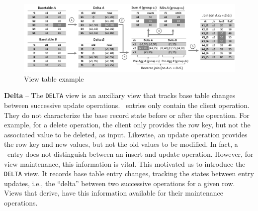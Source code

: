 


\begin{figure}
  \includegraphics[width=\linewidth]{figures/ViewCalculationExample}
  \caption{View table example}\label{fig:view_table_example}
\endminipage\hfill
\vspace{-2mm}  
\end{figure}

\noindent  
\textbf{Delta} -- The \texttt{DELTA} view is an auxiliary view that
tracks base table changes between successive update operations.  
\TL\ entries only contain the client operation.
They do not characterize the base record state before or after the
operation. For example, for a delete operation, the client only provides
the row key, but not the associated value to be deleted, as input.
Likewise, an update operation provides the row key and new values, but
not the old values to be modified. In fact, a \TL\ entry does not
distinguish between an insert and update operation. However, for view 
maintenance, this information is vital. This motivated us to introduce 
the \texttt{DELTA} view. It records base table entry changes, tracking 
the states between entry updates, i.e., the ``delta'' between two 
successive operations for a given row.  Views that derive, have this 
information available for their maintenance operations.

